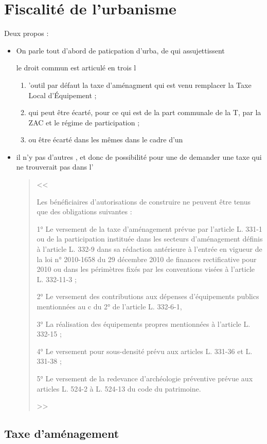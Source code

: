 \chapter{Fiscalité de l'urbanisme}

Deux propos :
\begin{itemize}
	\item On parle tout d'abord de paticpation d'urba, \cad de qui assujettissent
	
	le droit commun est articulé en trois 
	l\begin{enumerate}
		\item 'outil par défaut la taxe d'aménagment qui est venu remplacer la Taxe Local d'Équipement ;
		\item qui peut être écarté, pour ce qui est de la part communale de la T,  par la ZAC et le régime de participation ;
		\item ou être écarté dans les mêmes dans le cadre d'un \PUP
	\end{enumerate}

	\item il n'y pas d'autres , et donc de possibilité pour une \commune de demander une taxe qui ne trouverait pas dans l'
	\begin{quote}
		<< {Les bénéficiaires d'autorisations de construire ne peuvent être tenus que des obligations suivantes :
			
			1° Le versement de la taxe d'aménagement prévue par l'article L. 331-1 ou de la participation instituée dans les secteurs d'aménagement définis à l'article L. 332-9 dans sa rédaction antérieure à l'entrée en vigueur de la loi n° 2010-1658 du 29 décembre 2010 de finances rectificative pour 2010 ou dans les périmètres fixés par les conventions visées à l'article L. 332-11-3 ;
			
			2° Le versement des contributions aux dépenses d'équipements publics mentionnées au c du 2° de l'article L. 332-6-1, \lips 
			
			3° La réalisation des équipements propres mentionnées à l'article L. 332-15 ;
			
			4° Le versement pour sous-densité prévu aux articles L. 331-36 et L. 331-38 ;
			
			5° Le versement de la redevance d'archéologie préventive prévue aux articles L. 524-2 à L. 524-13 du code du patrimoine.} >>
	\end{quote}
\end{itemize}

\section{Taxe d'aménagement}

